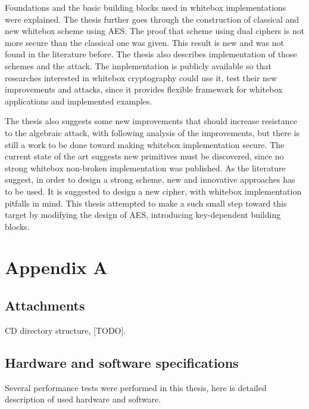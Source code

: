 \documentclass[11pt,oneside,final]{fithesis2}
\begin{document}
    Foundations and the basic building blocks used in whitebox implementations were explained. The thesis further goes through 
    the construction of classical and new whitebox scheme using AES. The proof that scheme using dual ciphers is not more secure than the classical one 
    was given. This result is new and was not found in the literature before. The thesis also describes implementation of those schemes and 
    the attack. The implementation is publicly available so that researches interested in whitebox cryptography could use it, test their new improvements and
    attacks, since it provides flexible framework for whitebox applications and implemented examples.
    
    The thesis also suggests some new improvements that should increase resistance to the algebraic attack, with following analysis of the improvements, but
    there is still a work to be done toward making whitebox implementation secure. The current state of the art suggests new primitives must be discovered, since
    no strong whitebox non-broken implementation was published. As the literature \citep{Billet:2004:CWB:2080787.2080809, wyseurPhd} suggest, in order 
    to design a strong scheme, new and innovative approaches has to be used. It is suggested to design a new cipher, with whitebox implementation pitfalls in mind.
    This thesis attempted to make a such small step toward this target by modifying the design of AES, introducing key-dependent building blocks.
    
\appendix

\chapter{Appendix A}
    \section{Attachments}\label{appendix:attach}
    CD directory structure, [TODO].
    
    
    \section{Hardware and software specifications}\label{appendix:hw_spec}
    Several performance tests were performed in this thesis, here is detailed description of used hardware and software.
    
\end{document}
